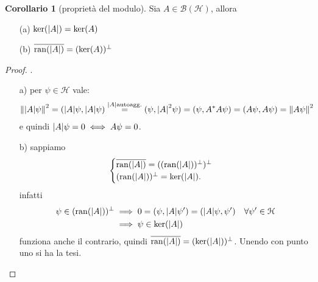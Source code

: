 \documentclass[a4paper,10pt]{article}
\theoremstyle{definition}
\DeclareMathOperator*{\ran}{ran}
\newcommand{\hil}{\mathcal{H}} %
\theoremstyle{indentdefinition}
\theoremstyle{indenttheorem}
\newtheorem{cor}{Corollario}
\theoremstyle{myremark}
\theoremstyle{indentgeneral}
\newenvironment{myboxed} 
{\noindent\begin{lrbox}{\mybox}\begin{minipage}{\textwidth}}
{\end{minipage}\end{lrbox}\fbox{\usebox{\mybox}}}
\begin{document}
\begin{myboxed}
\begin{cor}[proprietà del modulo]
    Sia $A\in\mathcal{B}(\hil)$, allora
        \begin{itemize}
        \item[(a)] $\ker(\abs{A})=\ker (A)$
         \item[(b)]  $\overline{\ran(\abs{A})}=(\ker(A))^\perp$
    \end{itemize}
\end{cor}
\end{myboxed}
\begin{proof}.
\begin{itemize}
    \item[a)] per $\psi \in \hil$ vale:
    \begin{align}\label{eq-modulo}
        \norm{\abs{A}\psi}^2=(\abs{A}\psi,\abs{A}\psi)\overset{\abs{A}\text{autoagg.}}{=}(\psi,\abs{A}^2\psi)=(\psi,A^*A\psi)=(A\psi,A\psi)=\norm{A\psi}^2
    \end{align}
    e quindi $\abs{A}\psi=0\iff A\psi=0$.
     \item[b)] sappiamo
     $$\begin{cases}
         \overline{\ran(\abs{A})}=((\ran(\abs{A}))^\perp)^\perp\\
         (\ran(\abs{A}))^\perp=\ker(\abs{A}).
     \end{cases}$$ infatti
     \begin{align*}
         \psi\in (\ran(\abs{A}))^\perp &\implies 0=(\psi,\abs{A}\psi')=(\abs{A}\psi,\psi')\quad \forall\psi'\in\hil\\
         &\implies \psi\in \ker(\abs{A})
     \end{align*}
     funziona anche il contrario, quindi $\overline{\ran(\abs{A})}=(\ker(\abs{A}))^\perp$. Unendo con punto uno si ha la tesi.
\end{itemize}
\end{proof}
\end{document}
